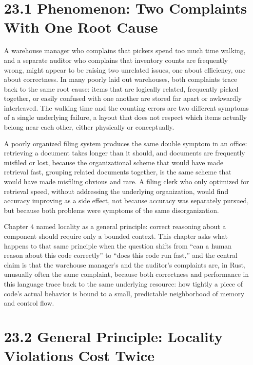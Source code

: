 \documentclass[11pt]{book}
\begin{document}
\section*{23.1 Phenomenon: Two Complaints With One Root Cause}

A warehouse manager who complains that pickers spend too much time walking, and a separate auditor who complains that inventory counts are frequently wrong, might appear to be raising two unrelated issues, one about efficiency, one about correctness. In many poorly laid out warehouses, both complaints trace back to the same root cause: items that are logically related, frequently picked together, or easily confused with one another are stored far apart or awkwardly interleaved. The walking time and the counting errors are two different symptoms of a single underlying failure, a layout that does not respect which items actually belong near each other, either physically or conceptually.

A poorly organized filing system produces the same double symptom in an office: retrieving a document takes longer than it should, and documents are frequently misfiled or lost, because the organizational scheme that would have made retrieval fast, grouping related documents together, is the same scheme that would have made misfiling obvious and rare. A filing clerk who only optimized for retrieval speed, without addressing the underlying organization, would find accuracy improving as a side effect, not because accuracy was separately pursued, but because both problems were symptoms of the same disorganization.

Chapter 4 named locality as a general principle: correct reasoning about a component should require only a bounded context. This chapter asks what happens to that same principle when the question shifts from ``can a human reason about this code correctly'' to ``does this code run fast,'' and the central claim is that the warehouse manager's and the auditor's complaints are, in Rust, unusually often the same complaint, because both correctness and performance in this language trace back to the same underlying resource: how tightly a piece of code's actual behavior is bound to a small, predictable neighborhood of memory and control flow.

\section*{23.2 General Principle: Locality Violations Cost Twice}
\end{document}
